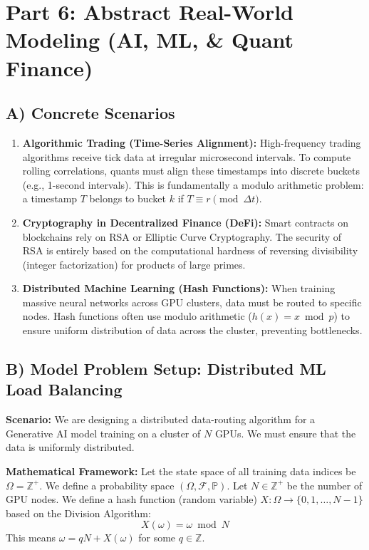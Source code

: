 \documentclass[11pt]{article}
\theoremstyle{definition}
\theoremstyle{remark}
\newcommand{\Z}{\mathbb{Z}}
\newcommand{\F}{\mathcal{F}}
\newcommand{\Prob}{\mathbb{P}}
\begin{document}
\section{Part 6: Abstract Real-World Modeling (AI, ML, \& Quant Finance)}

\subsection{A) Concrete Scenarios}
\begin{enumerate}
    \item \textbf{Algorithmic Trading (Time-Series Alignment):} High-frequency trading algorithms receive tick data at irregular microsecond intervals. To compute rolling correlations, quants must align these timestamps into discrete buckets (e.g., 1-second intervals). This is fundamentally a modulo arithmetic problem: a timestamp $T$ belongs to bucket $k$ if $T \equiv r \pmod{\Delta t}$.
    \item \textbf{Cryptography in Decentralized Finance (DeFi):} Smart contracts on blockchains rely on RSA or Elliptic Curve Cryptography. The security of RSA is entirely based on the computational hardness of reversing divisibility (integer factorization) for products of large primes.
    \item \textbf{Distributed Machine Learning (Hash Functions):} When training massive neural networks across GPU clusters, data must be routed to specific nodes. Hash functions often use modulo arithmetic ($h(x) = x \bmod p$) to ensure uniform distribution of data across the cluster, preventing bottlenecks.
\end{enumerate}

\subsection{B) Model Problem Setup: Distributed ML Load Balancing}
\textbf{Scenario:} We are designing a distributed data-routing algorithm for a Generative AI model training on a cluster of $N$ GPUs. We must ensure that the data is uniformly distributed.

\textbf{Mathematical Framework:}
Let the state space of all training data indices be $\Omega = \Z^+$. 
We define a probability space $(\Omega, \F, \Prob)$. 
Let $N \in \Z^+$ be the number of GPU nodes. We define a hash function (random variable) $X: \Omega \to \{0, 1, \dots, N-1\}$ based on the Division Algorithm:
\[ X(\omega) = \omega \bmod N \]
This means $\omega = qN + X(\omega)$ for some $q \in \Z$. 
\end{document}
